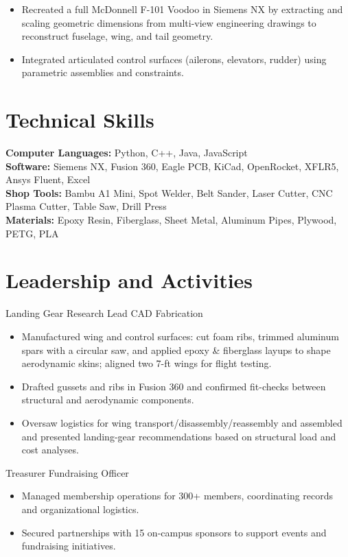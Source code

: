 \begin{itemize}
  \item Recreated a full McDonnell F-101 Voodoo in Siemens NX by extracting and scaling geometric dimensions from multi-view engineering drawings to reconstruct fuselage, wing, and tail geometry.
  \item Integrated articulated control surfaces (ailerons, elevators, rudder) using parametric assemblies and constraints.
\end{itemize}

\section{Technical Skills}
\textbf{Computer Languages:} Python, C++, Java, JavaScript\\
\textbf{Software:} Siemens NX, Fusion 360, Eagle PCB, KiCad, OpenRocket, XFLR5, Ansys Fluent, Excel\\
\textbf{Shop Tools:} Bambu A1 Mini, Spot Welder, Belt Sander, Laser Cutter, CNC Plasma Cutter, Table Saw, Drill Press\\
\textbf{Materials:} Epoxy Resin, Fiberglass, Sheet Metal, Aluminum Pipes, Plywood, PETG, PLA

\section{Leadership and Activities}

Landing Gear Research Lead \textbar{} CAD \textbar{} Fabrication
\begin{itemize}
  \item Manufactured wing and control surfaces: cut foam ribs, trimmed aluminum spars with a circular saw, and applied epoxy \& fiberglass layups to shape aerodynamic skins; aligned two 7-ft wings for flight testing.
  \item Drafted gussets and ribs in Fusion 360 and confirmed fit-checks between structural and aerodynamic components.
  \item Oversaw logistics for wing transport/disassembly/reassembly and assembled and presented landing-gear recommendations based on structural load and cost analyses.
\end{itemize}
\entrygap

Treasurer \textbar{} Fundraising Officer
\begin{itemize}
  \item Managed membership operations for 300+ members, coordinating records and organizational logistics.
  \item Secured partnerships with 15 on-campus sponsors to support events and fundraising initiatives.
\end{itemize}


